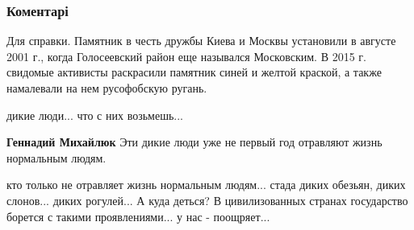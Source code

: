  
 
 
 
 
\subsubsection{Коментарі}

\begin{itemize}
 
Для справки. Памятник в честь дружбы Киева и Москвы установили в августе 2001 г., когда Голосеевский район еще назывался Московским. В 2015 г. свидомые активисты раскрасили памятник синей и желтой краской, а также намалевали на нем русофобскую ругань.

 
дикие люди... что с них возьмешь...

\begin{itemize}
 
\textbf{Геннадий Михайлюк} Эти дикие люди уже не первый год отравляют жизнь нормальным людям.

 

кто только не отравляет жизнь нормальным людям... стада диких обезьян, диких
слонов... диких рогулей... А куда деться? В цивилизованных странах государство
борется с такими проявлениями... у нас - поощряет...



\end{itemize}
\end{itemize}
